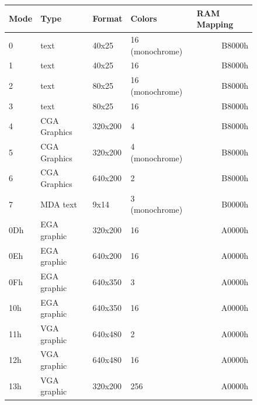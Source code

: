 \documentclass[book.tex]{subfiles}
\begin{document}
\begin{figure}[H]
\centering
\begin{table}[H]
\begin{tabularx}{\textwidth}[c]{llllr}
\hline
\textbf{Mode} & \textbf{Type} & \textbf{Format} & \textbf{Colors} & \multicolumn{1}{l}{\textbf{RAM Mapping}} \\ \hline
0             & text          & 40x25           & 16 (monochrome) & B8000h                                \\ \hline
1             & text          & 40x25           & 16              & B8000h                                \\ \hline
2             & text          & 80x25           & 16 (monochrome) & B8000h                                \\ \hline
3             & text          & 80x25           & 16              & B8000h                                \\ \hline
4             & CGA Graphics  & 320x200         & 4               & B8000h                                \\ \hline
5             & CGA Graphics  & 320x200         & 4 (monochrome)  & B8000h                                \\ \hline
6             & CGA Graphics  & 640x200         & 2               & B8000h                                \\ \hline
7             & MDA text      & 9x14            & 3 (monochrome)  & B0000h                                \\ \hline
0Dh           & EGA graphic   & 320x200         & 16              & A0000h                                \\ \hline
0Eh           & EGA graphic   & 640x200         & 16              & A0000h                                \\ \hline
0Fh           & EGA graphic   & 640x350         & 3               & A0000h                                \\ \hline
10h           & EGA graphic   & 640x350         & 16              & A0000h                                \\ \hline
11h           & VGA graphic   & 640x480         & 2               & A0000h                                \\ \hline
12h           & VGA graphic   & 640x480         & 16              & A0000h                                \\ \hline
13h           & VGA graphic   & 320x200         & 256             & A0000h                                \\ \hline
\end{tabularx}
\end{table}
\label{vga-modes-available}
 \end{figure}
 
\end{document}
